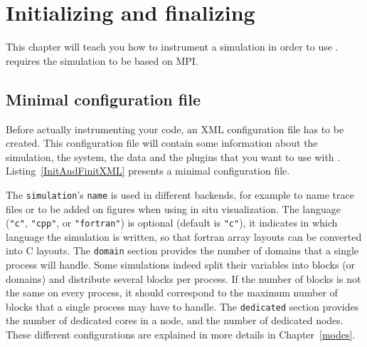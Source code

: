 
\section{Initializing and finalizing \Damaris{}}

This chapter will teach you how to instrument a simulation in order to 
use \Damaris. \Damaris{} requires the simulation to be based on MPI.

\subsection{Minimal configuration file}\label{sec:MinimalConfigFile}

Before actually instrumenting your code, an XML configuration file has 
to be created. This configuration file will contain some information about 
the simulation, the system, the data and the plugins that you want to use 
with \Damaris. Listing~\ref{InitAndFinitXML} presents a minimal configuration file.

\noindent\begin{minipage}{\textwidth}
\vspace{0.5cm}

\end{minipage}

The \texttt{simulation}'s \texttt{name} is used in different backends, for example to name trace files or
to be added on figures when using in situ visualization. The language (\texttt{"c"}, \texttt{"cpp"}, 
or \texttt{"fortran"}) is optional (default is \texttt{"c"}), it indicates in which language the simulation 
is written, so that fortran array layouts can be converted into C layouts.
The \texttt{domain} section provides the number of domains that a single process will handle. Some simulations
indeed split their variables into blocks (or domains) and distribute several blocks per process. If the number of
blocks is not the same on every process, it should correspond to the maximum number of blocks that a single process
may have to handle.
The \texttt{dedicated} section provides the number of dedicated cores in a node, and the number of dedicated nodes.
These different configurations are explained in more details in Chapter~\ref{modes}.

